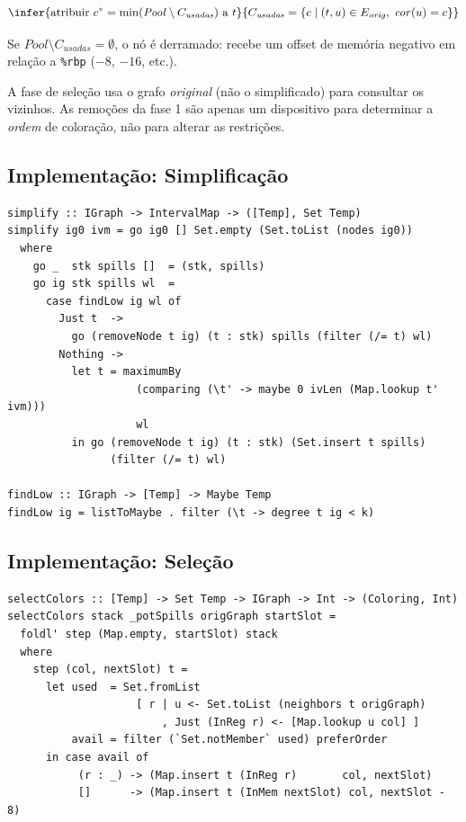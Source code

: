 \[
  \infer{\text{atribuir } c^* = \min(\mathit{Pool} \setminus
  C_{\mathit{usadas}}) \text{ a } t}
  {C_{\mathit{usadas}} = \{c \mid (t, u) \in E_{\mathit{orig}},\;
  \mathit{cor}(u) = c\}}
\]

Se $\mathit{Pool} \setminus C_{\mathit{usadas}} = \emptyset$, o nó é
derramado: recebe um offset de memória negativo em relação a
\texttt{\%rbp} ($-8$, $-16$, etc.).

A fase de seleção usa o grafo \emph{original} (não o simplificado) para
consultar os vizinhos. As remoções da fase 1 são apenas um dispositivo
para determinar a \emph{ordem} de coloração, não para alterar as restrições.

\subsection{Implementação: Simplificação}

\begin{verbatim}
simplify :: IGraph -> IntervalMap -> ([Temp], Set Temp)
simplify ig0 ivm = go ig0 [] Set.empty (Set.toList (nodes ig0))
  where
    go _  stk spills []  = (stk, spills)
    go ig stk spills wl  =
      case findLow ig wl of
        Just t  ->
          go (removeNode t ig) (t : stk) spills (filter (/= t) wl)
        Nothing ->
          let t = maximumBy
                    (comparing (\t' -> maybe 0 ivLen (Map.lookup t' ivm)))
                    wl
          in go (removeNode t ig) (t : stk) (Set.insert t spills)
                (filter (/= t) wl)

findLow :: IGraph -> [Temp] -> Maybe Temp
findLow ig = listToMaybe . filter (\t -> degree t ig < k)
\end{verbatim}

\subsection{Implementação: Seleção}

\begin{verbatim}
selectColors :: [Temp] -> Set Temp -> IGraph -> Int -> (Coloring, Int)
selectColors stack _potSpills origGraph startSlot =
  foldl' step (Map.empty, startSlot) stack
  where
    step (col, nextSlot) t =
      let used  = Set.fromList
                    [ r | u <- Set.toList (neighbors t origGraph)
                        , Just (InReg r) <- [Map.lookup u col] ]
          avail = filter (`Set.notMember` used) preferOrder
      in case avail of
           (r : _) -> (Map.insert t (InReg r)       col, nextSlot)
           []      -> (Map.insert t (InMem nextSlot) col, nextSlot - 8)
\end{verbatim}


